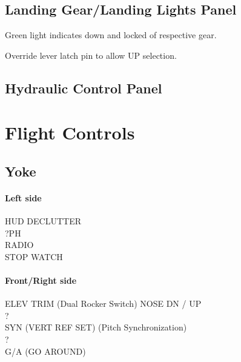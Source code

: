 \subsection{Landing Gear/Landing Lights Panel}

\begin{enumerate}
    \begin{itemize}
    \end{itemize}
   Green light indicates down and locked of respective gear.
    \begin{itemize}
    \end{itemize}
   Override lever latch pin to allow UP selection.
\end{enumerate}

\subsection{Hydraulic Control Panel}

\section{Flight Controls}

\subsection{Yoke}

\paragraph*{Left side}
HUD DECLUTTER\\
?PH\\
RADIO\\
STOP WATCH

\paragraph*{Front/Right side}
ELEV TRIM (Dual Rocker Switch) NOSE DN / UP\\
?\\
SYN (VERT REF SET) (Pitch Synchronization)\\
?\\
G/A (GO AROUND)

